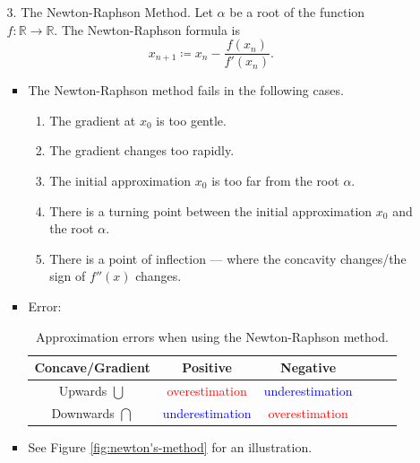 \documentclass[../Notes.tex]{subfiles}
\begin{document}
\begin{stbox}{}
    \begin{itemize}
        \item[]
        \begin{enumerate}
            \item[3.] The Newton-Raphson Method. Let \(\alpha\) be a root of the function \(f\colon \mathbb{R}\to \mathbb{R}\). The Newton-Raphson formula is
            \[x_{n+1}\coloneq x_n-\frac{f(x_n)}{f'(x_n)}.\]
            \begin{itemize}
                \item The Newton-Raphson method fails in the following cases.
                \begin{enumerate}
                    \item The gradient at \(x_0\) is too gentle.
                    \item The gradient changes too rapidly.
                    \item The initial approximation \(x_0\) is too far from the root \(\alpha\).
                    \item There is a turning point between the initial approximation \(x_0\) and the root \(\alpha\).
                    \item There is a point of inflection --- where the concavity changes/the sign of \(f''(x)\) changes.
                \end{enumerate}
                \item Error: 
                \begin{table}[H]
                    \centering
                    \begin{tabular}{|Sc|Sc|Sc|}
                        \hline
                        Concave/Gradient & Positive & Negative\\
                        \hline
                        Upwards \(\bigcup\) & \textcolor{red}{overestimation} & \textcolor{blue}{underestimation}\\
                        \hline
                        Downwards \(\bigcap\) & \textcolor{blue}{underestimation} & \textcolor{red}{overestimation}\\
                        \hline
                    \end{tabular}
                    \caption{Approximation errors when using the Newton-Raphson method.}
                    \label{table:newton-raphson}
                \end{table}
                \item See Figure \ref{fig:newton's-method} for an illustration.
            \end{itemize}
        \end{enumerate}
    \end{itemize}
\end{stbox}
\end{document}
